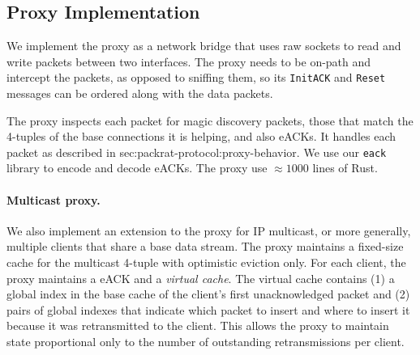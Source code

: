 \subsection{Proxy Implementation}
\label{sec:implementation:proxy}


We implement the \Sys proxy as a network bridge that uses raw sockets to read
and write packets between two interfaces. The proxy needs to
be on-path and intercept the packets, as opposed to sniffing them, so
its \texttt{InitACK} and \texttt{Reset} messages can be ordered along with the
data packets.

The proxy inspects each packet for magic discovery packets, those that match the
4-tuples of the base connections it is helping, and also eACKs.
It handles each packet as described in \Cref
{sec:packrat-protocol:proxy-behavior}. We use our \texttt{eack} library to
encode and decode eACKs. The proxy use $\approx\!1000$ lines of Rust.


\paragraph{Multicast proxy.}

We also implement an extension to the \Sys proxy for IP multicast, or more
generally, multiple clients that share a base data stream. The proxy maintains
a fixed-size cache for the multicast 4-tuple with optimistic eviction only. For
each client, the proxy maintains a eACK and a \textit{virtual cache}. The
virtual cache contains (1) a global index in the base cache of the client's
first unacknowledged packet and (2) pairs of global indexes that indicate which
packet to insert and where to insert it because it was retransmitted to the
client. This allows the proxy to maintain state proportional only to the number
of outstanding retransmissions per client.



